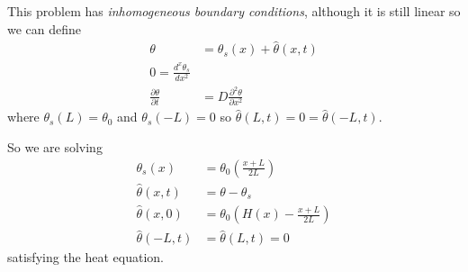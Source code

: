\documentclass[a4paper]{article}
\begin{document}
This problem has \emph{inhomogeneous boundary conditions}, although it is still linear so we can define
\begin{align*}
  \theta &= \theta_s(x) + \hat \theta(x, t) \\
  0 = \frac{d^x \theta_s}{dx^2} \\
  \frac{\partial \theta}{\partial t} &= D \frac{\partial^2 \theta}{\partial x^2}
\end{align*}
where \(\theta_s(L) = \theta_0\) and \(\theta_s(-L) = 0\) so \(\hat \theta(L, t) = 0 = \hat \theta(-L, t)\).

So we are solving
\begin{align*}
  \theta_s(x) &= \theta_0 \left( \frac{x+L}{2L} \right) \\
  \hat \theta(x, t) &= \theta - \theta_s \\
  \hat \theta(x, 0) &= \theta_0 \left( H(x) - \frac{x+L}{2L} \right) \\
  \hat \theta(-L, t) &= \hat \theta(L, t) = 0
\end{align*}
satisfying the heat equation.
\end{document}
